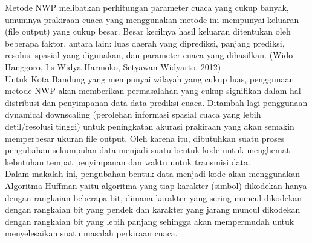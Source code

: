 \documentclass[journal]{IEEEtran}
\begin{document}
\hspace*{1cm}Metode NWP melibatkan perhitungan parameter cuaca yang cukup banyak, umumnya prakiraan cuaca yang menggunakan metode ini mempunyai keluaran (file output) yang cukup besar. Besar kecilnya hasil keluaran ditentukan oleh beberapa faktor, antara lain: luas daerah yang diprediksi, panjang prediksi, resolusi spasial yang digunakan, dan parameter cuaca yang dihasilkan. (Wido Hanggoro, Iis Widya Harmoko, Setyawan Widyarto, 2012)\\
\hspace*{1cm}Untuk Kota Bandung yang mempunyai wilayah yang cukup luas, penggunaan metode NWP akan memberikan permasalahan yang cukup signifikan dalam hal distribusi dan penyimpanan data-data prediksi cuaca. Ditambah lagi penggunaan dynamical downscaling (perolehan informasi spasial cuaca yang lebih detil/resolusi tinggi) untuk peningkatan akurasi prakiraan yang akan semakin memperbesar ukuran file output. Oleh karena itu, dibutuhkan suatu proses pengubahan sekumpulan data menjadi suatu bentuk kode untuk menghemat kebutuhan tempat penyimpanan dan waktu untuk transmisi data.\\
\hspace*{1cm}Dalam makalah ini, pengubahan bentuk data menjadi kode akan menggunakan Algoritma Huffman yaitu algoritma yang tiap karakter (simbol) dikodekan hanya dengan rangkaian beberapa bit, dimana karakter yang sering muncul dikodekan dengan rangkaian bit yang pendek dan karakter yang jarang muncul dikodekan dengan rangkaian bit yang lebih panjang sehingga akan mempermudah untuk menyelesaikan suatu masalah perkiraan cuaca.
\end{document}
